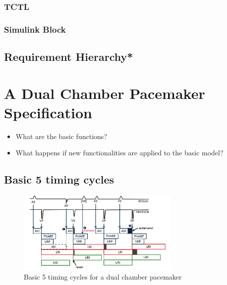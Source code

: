 \documentclass[openany]{now} %
\begin{document}
\subsection{TCTL}
\subsection{Simulink Block}
 
\section{Requirement Hierarchy*}


\chapter{A Dual Chamber Pacemaker Specification}
\begin{itemize}
	\item What are the basic functions?
    \item What happens if new functionalities are applied to the basic model?
\end{itemize}

\section{Basic 5 timing cycles}
\begin{figure}[!b]
\center
\includegraphics[width=0.7\textwidth]{figs/PM_timers.pdf}
\caption{Basic 5 timing cycles for a dual chamber pacemaker}
\label{fig:PMtimers}
\end{figure} 
\end{document}
